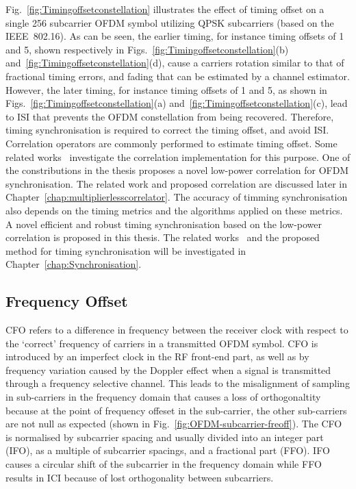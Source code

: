Fig.~\ref{fig:Timingoffsetconstellation} illustrates the effect of timing offset on a single 256 subcarrier OFDM symbol utilizing QPSK subcarriers (based on the IEEE~802.16).
As can be seen, the earlier timing, for instance timing offsets of 1 and 5, shown respectively in Figs.~\ref{fig:Timingoffsetconstellation}(b) and~\ref{fig:Timingoffsetconstellation}(d), cause a carriers rotation similar to that of fractional timing errors, and fading that can be estimated by a channel estimator.
However, the later timing, for instance timing offsets of 1 and 5, as shown in Figs.~\ref{fig:Timingoffsetconstellation}(a) and~\ref{fig:Timingoffsetconstellation}(c), lead to ISI that prevents the OFDM constellation from being recovered. 
Therefore, timing synchronisation is required to correct the timing offset, and avoid ISI.
Correlation operators are commonly performed to estimate timing offset. Some related works~\cite{Dick2003,Fort2003,Wang2004} investigate the correlation implementation for this purpose. One of the constributions in the thesis proposes a novel low-power correlation for OFDM synchronisation. The related work and proposed correlation are discussed later in Chapter~\ref{chap:multiplierlesscorrelator}. 
The accuracy of timming synchronisation also depends on the timing metrics and the algorithms applied on these metrics. A novel efficient and robust timing synchronisation based on the low-power correlation is proposed in this thesis. The related works~\cite{Schmidl1997,Kishore2006,Guffey2007,Huang2010,Recio2010} and the proposed method for timing synchronisation will be investigated in Chapter~\ref{chap:Synchronisation}.
\subsection{Frequency Offset}

CFO refers to a difference in frequency between the receiver clock with respect to the `correct' frequency of carriers in a transmitted OFDM symbol. 
CFO is introduced by an imperfect clock in the RF front-end part, as well as by frequency variation caused by the Doppler effect when a signal is transmitted through a frequency selective channel. 
This leads to the misalignment of sampling in sub-carriers in the frequency domain that causes a loss of orthogonaltity because at the point of frequency offeset in the sub-carrier, the other sub-carriers are not null as expected (shown in Fig.~\ref{fig:OFDM-subcarrier-freoff}).
The CFO is normalised by subcarrier spacing and usually divided into an integer part (IFO), as a multiple of subcarrier spacings, and a fractional part (FFO). 
IFO causes a circular shift of the subcarrier in the frequency domain while FFO results in ICI because of lost orthogonality between subcarriers.

